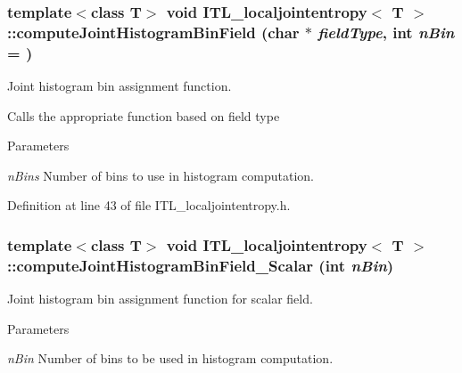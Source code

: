 \hypertarget{classITL__localjointentropy_ae9be80bf2f4a78369bcbddcddc59d6d7}{
\subsubsection[{computeJointHistogramBinField}]{\setlength{\rightskip}{0pt plus 5cm}template$<$class T$>$ void {\bf ITL\_\-localjointentropy}$<$ T $>$::computeJointHistogramBinField (char $\ast$ {\em fieldType}, \/  int {\em nBin} = {})}}
\label{classITL__localjointentropy_ae9be80bf2f4a78369bcbddcddc59d6d7}


Joint histogram bin assignment function. 

Calls the appropriate function based on field type 
\begin{DoxyParams}{Parameters}
\item[{\em nBins}]Number of bins to use in histogram computation. \end{DoxyParams}


Definition at line 43 of file ITL\_\-localjointentropy.h.

\hypertarget{classITL__localjointentropy_a1b96f07f6412ed4de52831b52b1c76b3}{
\subsubsection[{computeJointHistogramBinField\_\-Scalar}]{\setlength{\rightskip}{0pt plus 5cm}template$<$class T$>$ void {\bf ITL\_\-localjointentropy}$<$ T $>$::computeJointHistogramBinField\_\-Scalar (int {\em nBin})}}
\label{classITL__localjointentropy_a1b96f07f6412ed4de52831b52b1c76b3}


Joint histogram bin assignment function for scalar field. 


\begin{DoxyParams}{Parameters}
\item[{\em nBin}]Number of bins to be used in histogram computation. \end{DoxyParams}



